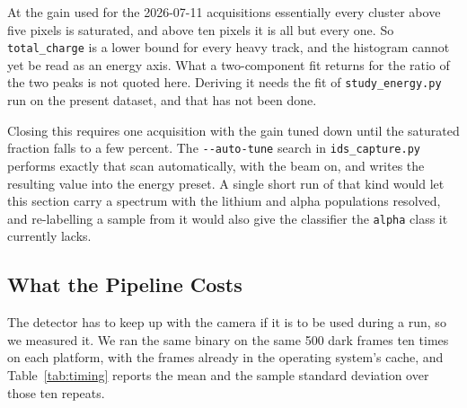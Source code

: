 \documentclass[a4paper,headsepline,oneside,11pt]{scrartcl}
\begin{document}
At the gain used for the 2026-07-11 acquisitions essentially every cluster above
five pixels is saturated, and above ten pixels it is all but every one. So
\texttt{total\_charge} is a lower bound for every heavy track, and the histogram
cannot yet be read as an energy axis. What a two-component fit returns for the ratio of the two peaks is not
quoted here. Deriving it needs the fit of \texttt{study\_energy.py} run on the
present dataset, and that has not been done.

Closing this requires one acquisition with the gain tuned down until the
saturated fraction falls to a few percent. The \texttt{-{}-auto-tune} search in
\texttt{ids\_capture.py} performs exactly that scan automatically, with the
beam on, and writes the resulting value into the energy preset. A single short
run of that kind would let this section carry a spectrum with the lithium and
alpha populations resolved, and re-labelling a sample from it would also give
the classifier the \texttt{alpha} class it currently lacks.


\subsection{What the Pipeline Costs}
\label{sec:pipeline_cost}

The detector has to keep up with the camera if it is to be used during a run, so
we measured it. We ran the same binary on the same
500 dark frames ten times on each platform, with the frames already in the
operating system's cache, and Table~\ref{tab:timing} reports the mean and the
sample standard deviation over those ten repeats.
\end{document}
